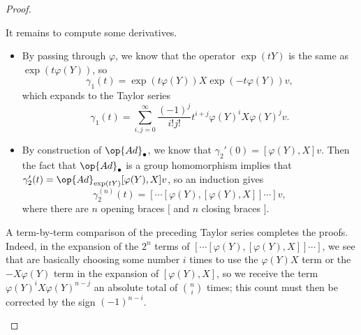 \documentclass[../notes.tex]{subfiles}
\begin{document}
\begin{proof}
\begin{enumerate}
		It remains to compute some derivatives.
		\begin{itemize}
			\item By passing through $\varphi$, we know that the operator $\exp(tY)$ is the same as $\exp(t\varphi(Y))$, so
			\[\gamma_1(t)=\exp(t\varphi(Y))X\exp(-t\varphi(Y))v,\]
			which expands to the Taylor series
			\[\gamma_1(t)=\sum_{i,j=0}^\infty\frac{(-1)^j}{i!j!}t^{i+j}\varphi(Y)^iX\varphi(Y)^jv.\]
			\item By construction of $\op{Ad}_\bullet$, we know that $\gamma_2'(0)=[\varphi(Y),X]v$. Then the fact that $\op{Ad}_\bullet$ is a group homomorphism implies that $\gamma_2'(t)=\op{Ad}_{\exp(tY)}[\varphi(Y),X]v$, so an induction gives
			\[\gamma_2^{(n)}(t)=[\cdots[\varphi(Y),[\varphi(Y),X]]\cdots]v,\]
			where there are $n$ opening braces $[$ and $n$ closing braces $]$.
		\end{itemize}
		A term-by-term comparison of the preceding Taylor series completes the proofs. Indeed, in the expansion of the $2^n$ terms of $[\cdots[\varphi(Y),[\varphi(Y),X]]\cdots]$, we see that are basically choosing some number $i$ times to use the $\varphi(Y)X$ term or the $-X\varphi(Y)$ term in the expansion of $[\varphi(Y),X]$, so we receive the term $\varphi(Y)^iX\varphi(Y)^{n-j}$ an absolute total of $\binom ni$ times; this count must then be corrected by the sign $(-1)^{n-i}$.
		\qedhere
	\end{enumerate}
\end{proof}
\end{document}
